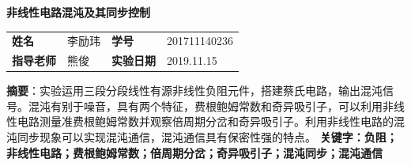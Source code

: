 \documentclass[UTF8]{ctexart}
\begin{document}
\begin{center}
\Huge\textbf{非线性电路混沌及其同步控制}
\renewcommand{\baselinestretch}{5.0}
\end{center}
\begin{center}
\small
\begin{tabular}{llll}
\textbf{姓名}&李励玮     &\textbf{学号}  &201711140236\\
\textbf{指导老师}&熊俊 &\textbf{实验日期}& 2019.11.15\\
\end{tabular}
\end{center}

\small
\noindent\textbf{摘要}：实验运用三段分段线性有源非线性负阻元件，搭建蔡氏电路，输出混沌信号。混沌有别于噪音，具有两个特征，费根鲍姆常数和奇异吸引子，可以利用非线性电路测量准费根鲍姆常数并观察倍周期分岔和奇异吸引子。利用非线性电路的混沌同步现象可以实现混沌通信，混沌通信具有保密性强的特点。
\newline\textbf{关键字：负阻；非线性电路；费根鲍姆常数；倍周期分岔；奇异吸引子；混沌同步；混沌通信}

~\\
\end{document}

